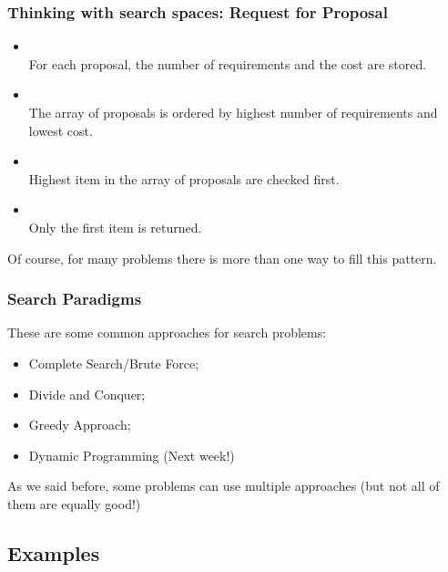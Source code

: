 \documentclass{beamer}
\begin{document}
\begin{frame}
  \frametitle{Thinking with search spaces: Request for Proposal}
  \begin{itemize}
  \item {}\\
    For each proposal, the number of requirements and the cost are stored.
  \item {}\\
    The array of proposals is ordered by highest number of requirements and lowest cost.
  \item {}\\
    Highest item in the array of proposals are checked first.
  \item {}\\
    Only the first item is returned.
  \end{itemize}  

  \bigskip

  Of course, for many problems there is more than one way to fill this
  pattern.
\end{frame}

\begin{frame}
  \frametitle{Search Paradigms}
  These are some common approaches for search problems:
  
  \begin{itemize}
    \item Complete Search/Brute Force;
    \item Divide and Conquer;
    \item Greedy Approach;
    \item Dynamic Programming (Next week!)
  \end{itemize}

  \bigskip

  As we said before, some problems can use multiple approaches (but
  not all of them are equally good!)
\end{frame}

\subsection{Examples}
\end{document}
